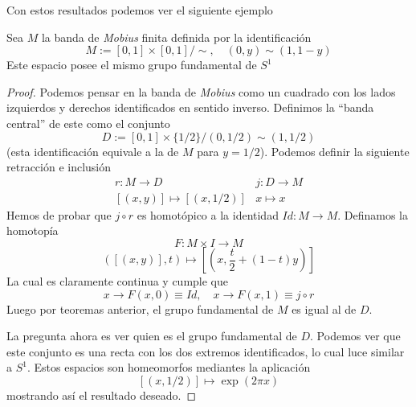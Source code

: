 Con estos resultados podemos ver el siguiente ejemplo
\begin{corolario} \label{ex:mobius}
  Sea \(M\) la banda de \emph{Mobius} finita definida por la identificación
  \[ M := [0,1] \times [0,1] / \sim, \quad (0,y) \sim (1, 1 - y) \]
  Este espacio posee el mismo grupo fundamental de \(S^1\)
\end{corolario}
\begin{proof}
  Podemos pensar en la banda de \emph{Mobius} como un cuadrado con los
  lados izquierdos y derechos identificados en sentido inverso.
  Definimos la ``banda central'' de este como el conjunto
  \[ D := [0,1] \times \{1 / 2\} / (0, 1 / 2) \sim (1,1 / 2) \]
  (esta identificación equivale a la de \(M\) para \(y = 1/2\)). Podemos
  definir la siguiente retracción e inclusión
  \[
    \begin{matrix}
      r : M \to D & j : D \to M \\
      [(x,y)] \mapsto [(x, 1/2)] & x \mapsto x
    \end{matrix}
  \]
  Hemos de probar que \(j \circ r\) es homotópico a la identidad \(Id
  : M \to M\). Definamos la homotopía
  \[ F : M \times I \to M \]
  \[ ([(x,y)], t) \mapsto [(x, \frac t 2 + (1-t) y)] \]
  La cual es claramente continua y cumple que
  \[ x \to F(x,0) \equiv Id,\quad x \to F(x,1) \equiv j \circ r\]
  Luego por teoremas anterior, el grupo fundamental de
  \(M\) es igual al de \(D\).

  La pregunta ahora es ver quien es el grupo fundamental de \(D\).
  Podemos ver que este conjunto es una recta con los dos extremos
  identificados, lo cual luce similar a \(S^1\). Estos espacios son
  homeomorfos mediantes la aplicación
  \[[(x, 1/2)] \mapsto \exp (2 \pi x)\]
  mostrando así el resultado deseado.
\end{proof}

